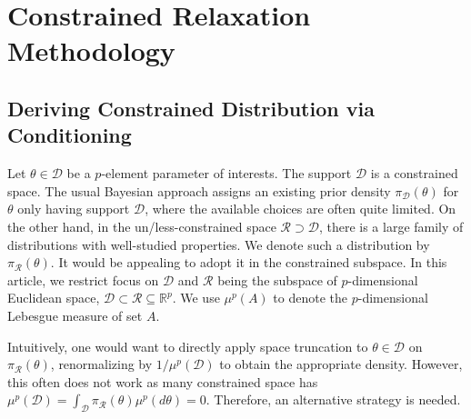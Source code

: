 \documentclass[10pt,fleqn]{article}
\newcommand{\bb}[1]{\mathbb{#1}}
\newcommand{\mc}[1]{\mathcal{#1}}
\DeclareMathOperator{\1}{\mathbbm{1}}
\begin{document}
\section{Constrained Relaxation Methodology}

\subsection{Deriving Constrained Distribution via Conditioning}

Let $\theta\in \mc D$ be a $p$-element parameter of interests. The support $\mc
D$ is a constrained space. The usual Bayesian approach assigns an existing prior
density $\pi_{\mc D}(\theta)$ for $\theta$ only having support $\mc D$, where the available choices are often quite limited. On the other hand, in the un/less-constrained space $\mc R\supset \mc D$, there is a large family of
distributions with well-studied properties. We denote such a distribution by $\pi_{\mc R}(\theta)$. It would be appealing to 
adopt it in the constrained subspace. In this article, we restrict focus on $\mc D$ and $\mc R$ being the subspace of $p$-dimensional Euclidean space, $\mc D \subset\mc R\subseteq \bb R^p$. We use $\mu^p(A)$ to denote the $p$-dimensional Lebesgue measure of set $A$.

Intuitively, one would want to directly apply space truncation to ${\theta\in\mc D}$ on $\pi_{\mc R}(\theta)$, renormalizing by $1/\mu^p(\mc D)$ to obtain the appropriate density. However, this often does not work as many constrained
space has $\mu^p(\mc D)=\int_{\mc D}  \pi_{\mc R}(\theta) \mu^p(d\theta)=0$. Therefore, an alternative strategy is needed.
\end{document}
